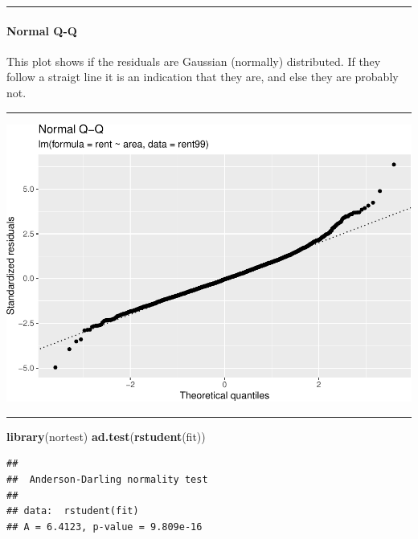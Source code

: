 \documentclass[
]{article}
\newenvironment{Shaded}{\begin{snugshade}}{\end{snugshade}}
\newcommand{\FunctionTok}[1]{\textcolor[rgb]{0.13,0.29,0.53}{\textbf{#1}}}
\newcommand{\NormalTok}[1]{#1}
\begin{document}
\begin{center}\rule{0.5\linewidth}{0.5pt}\end{center}

\hypertarget{normal-q-q}{%
\paragraph{Normal Q-Q}\label{normal-q-q}}

This plot shows if the residuals are Gaussian (normally) distributed. If
they follow a straigt line it is an indication that they are, and else
they are probably not.

\begin{center}\rule{0.5\linewidth}{0.5pt}\end{center}

\includegraphics{2MLR_files/figure-latex/unnamed-chunk-10-1.pdf}

\begin{center}\rule{0.5\linewidth}{0.5pt}\end{center}

\begin{Shaded}
\begin{Highlighting}[]
\FunctionTok{library}\NormalTok{(nortest)}
\FunctionTok{ad.test}\NormalTok{(}\FunctionTok{rstudent}\NormalTok{(fit))}
\end{Highlighting}
\end{Shaded}

\begin{verbatim}
## 
##  Anderson-Darling normality test
## 
## data:  rstudent(fit)
## A = 6.4123, p-value = 9.809e-16
\end{verbatim}
\end{document}
